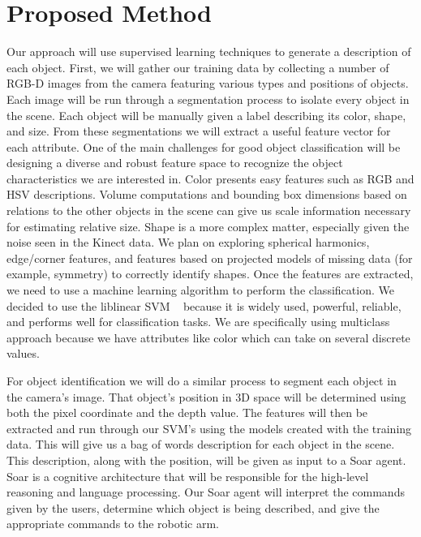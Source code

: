 \documentclass[11pt]{article}
\newcommand{\xxx}[1]{{\bf \color{red} #1}}
\begin{document}
\section{Proposed Method}

Our approach will use supervised learning techniques to generate a description of each object. First, we will gather our training data by collecting a number of RGB-D images from the camera featuring various types and positions of objects. Each image will be run through a segmentation process to isolate every object in the scene. Each object will be manually given a label describing its color, shape, and size. From these segmentations we will extract a useful feature vector for each attribute. One of the main challenges for good object classification will be designing a
diverse and robust feature space to recognize the object characteristics we
are interested in. Color presents easy features such as RGB and HSV
descriptions. Volume computations and bounding box dimensions based on
relations to the other objects in the scene can give us scale information
necessary for estimating relative size. Shape is a more complex matter,
especially given the noise seen in the Kinect data. We plan on exploring
spherical harmonics, edge/corner features, and features based on projected
models of missing data (for example, symmetry) to correctly identify shapes.
Once the features are extracted, we need to use a machine learning algorithm to perform the classification. We decided to use the liblinear SVM ~\cite{LIBLINEAR} because it is widely used, powerful, reliable, and performs well for classification tasks. We are specifically using multiclass approach because we have attributes like color which can take on several discrete values.

For object identification we will do a similar process to segment each object in the camera's image. That object's position in 3D space will be determined using both the pixel coordinate and the depth value. The features will then be extracted and run through our SVM's using the models created with the training data. This will give us a bag of words description for each object in the scene. This description, along with the position, will be given as input to a Soar agent. Soar is a cognitive architecture that will be responsible for the high-level reasoning and language processing. Our Soar agent will interpret the commands given by the users, determine which object is being described, and give the appropriate commands to the robotic arm.
\end{document}
